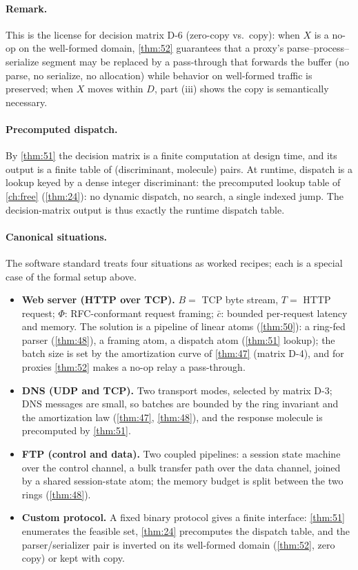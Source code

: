 \paragraph{Remark.}
This is the license for decision matrix D-6 (zero-copy vs.\ copy): when $X$ is a no-op on the well-formed domain, \autoref{thm:52} guarantees that a proxy's parse--process--serialize segment may be replaced by a pass-through that forwards the buffer (no parse, no serialize, no allocation) while behavior on well-formed traffic is preserved; when $X$ moves within $D$, part (iii) shows the copy is semantically necessary.

\paragraph{Precomputed dispatch.}
By \autoref{thm:51} the decision matrix is a finite computation at design time, and its output is a finite table of (discriminant, molecule) pairs. At runtime, dispatch is a lookup keyed by a dense integer discriminant: the precomputed lookup table of \autoref{ch:free} (\autoref{thm:24}): no dynamic dispatch, no search, a single indexed jump. The decision-matrix output is thus exactly the runtime dispatch table.

\paragraph{Canonical situations.}
The software standard treats four situations as worked recipes; each is a special case of the formal setup above.
\begin{itemize}
\item \textbf{Web server (HTTP over TCP).} $B = $ TCP byte stream, $T = $ HTTP request; $\Phi$: RFC-conformant request framing; $\bar c$: bounded per-request latency and memory. The solution is a pipeline of linear atoms (\autoref{thm:50}): a ring-fed parser (\autoref{thm:48}), a framing atom, a dispatch atom (\autoref{thm:51} lookup); the batch size is set by the amortization curve of \autoref{thm:47} (matrix D-4), and for proxies \autoref{thm:52} makes a no-op relay a pass-through.
\item \textbf{DNS (UDP and TCP).} Two transport modes, selected by matrix D-3; DNS messages are small, so batches are bounded by the ring invariant and the amortization law (\autoref{thm:47}, \autoref{thm:48}), and the response molecule is precomputed by \autoref{thm:51}.
\item \textbf{FTP (control and data).} Two coupled pipelines: a session state machine over the control channel, a bulk transfer path over the data channel, joined by a shared session-state atom; the memory budget is split between the two rings (\autoref{thm:48}).
\item \textbf{Custom protocol.} A fixed binary protocol gives a finite interface: \autoref{thm:51} enumerates the feasible set, \autoref{thm:24} precomputes the dispatch table, and the parser/serializer pair is inverted on its well-formed domain (\autoref{thm:52}, zero copy) or kept with copy.
\end{itemize}

